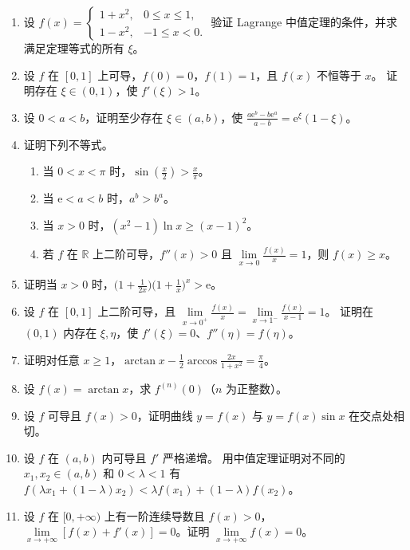 \documentclass[UTF8,a4paper,zihao=-4,fontset=fandol]{ctexart}
\renewcommand{\lim}{\operatorname*{lim}\limits}
\begin{document}
\begin{enumerate}[start=50]
\item 设 $f(x)=\begin{cases}1+x^2,&0\le x\le1,\\1-x^2,&-1\le x<0.\end{cases}$
验证 Lagrange 中值定理的条件，并求满足定理等式的所有 $\xi$。
\item 设 $f$ 在 $[0,1]$ 上可导，$f(0)=0$，$f(1)=1$，且 $f(x)$ 不恒等于 $x$。
证明存在 $\xi\in(0,1)$，使 $f'(\xi)>1$。
\item 设 $0<a<b$，证明至少存在 $\xi\in(a,b)$，使
$\displaystyle\frac{a\mathrm e^b-b\mathrm e^a}{a-b}=\mathrm e^\xi(1-\xi)$。
\item 证明下列不等式。
\begin{enumerate}[label=(\arabic*),nosep]
\item 当 $0<x<\pi$ 时，$\sin(\frac{x}{2})>\frac{x}{\pi}$。
\item 当 $\mathrm e<a<b$ 时，$a^b>b^a$。
\item 当 $x>0$ 时，$(x^2-1)\ln x\ge(x-1)^2$。
\item 若 $f$ 在 $\mathbb R$ 上二阶可导，$f''(x)>0$ 且 $\lim_{x\to0}\frac{f(x)}{x}=1$，则 $f(x)\ge x$。
\end{enumerate}
\item 证明当 $x>0$ 时，$\big(1+\frac1{2x}\big)\big(1+\frac1x\big)^x>\mathrm e$。
\item 设 $f$ 在 $[0,1]$ 上二阶可导，且
$\displaystyle\lim_{x\to0^+}\frac{f(x)}x=\lim_{x\to1^-}\frac{f(x)}{x-1}=1$。
证明在 $(0,1)$ 内存在 $\xi,\eta$，使 $f'(\xi)=0$、$f''(\eta)=f(\eta)$。
\item 证明对任意 $x\ge1$，$\arctan x-\frac12\arccos\frac{2x}{1+x^2}=\frac\pi4$。
\item 设 $f(x)=\arctan x$，求 $f^{(n)}(0)$（$n$ 为正整数）。
\item 设 $f$ 可导且 $f(x)>0$，证明曲线 $y=f(x)$ 与 $y=f(x)\sin x$ 在交点处相切。
\item 设 $f$ 在 $(a,b)$ 内可导且 $f'$ 严格递增。
用中值定理证明对不同的 $x_1,x_2\in(a,b)$ 和 $0<\lambda<1$ 有
$f(\lambda x_1+(1-\lambda)x_2)<\lambda f(x_1)+(1-\lambda)f(x_2)$。
\item 设 $f$ 在 $[0,+\infty)$ 上有一阶连续导数且 $f(x)>0$，
$\displaystyle\lim_{x\to+\infty}[f(x)+f'(x)]=0$。证明 $\displaystyle\lim_{x\to+\infty}f(x)=0$。

\end{enumerate}
\end{document}
